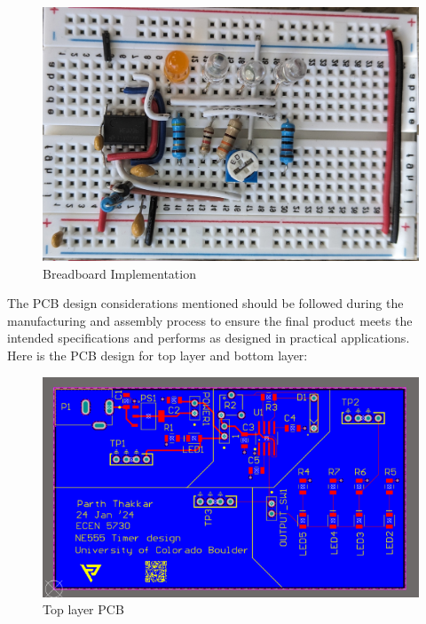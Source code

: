 \documentclass[a4paper,11pt]{article}%
\begin{document}
\begin{figure}[H]
	\centering
	\includegraphics[scale=0.2]{figures/breadboard.jpg}
	\caption{Breadboard Implementation}
	\label{breadboard}
\end{figure}


The PCB design considerations mentioned should be followed during the manufacturing and assembly process to ensure the final product meets the intended specifications and performs as designed in practical applications.\\

Here is the PCB design for top layer and bottom layer:\\

\begin{figure}[H]
	\centering
	\includegraphics[scale=0.8]{figures/top.png}
	\caption{Top layer PCB}
	\label{top}
\end{figure}
\end{document}
